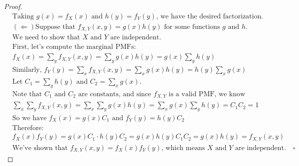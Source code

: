 \documentclass[letterpaper, 11pt]{article}
\newcommand{\1}{\mathds{1}}	%
\theoremstyle{definition}
\begin{document}
\begin{proof}
\begin{align*}
&\text{Taking } g(x) = f_X(x) \text{ and } h(y) = f_Y(y) \text{, we have the desired factorization.}\\
&(\Leftarrow) \text{Suppose that } f_{X,Y}(x,y) = g(x)h(y) \text{ for some functions } g \text{ and } h.\\
&\text{We need to show that } X \text{ and } Y \text{ are independent.}\\
&\text{First, let's compute the marginal PMFs:}\\
&f_X(x) = \sum_y f_{X,Y}(x,y) = \sum_y g(x)h(y) = g(x)\sum_y h(y)\\
&\text{Similarly, } f_Y(y) = \sum_x f_{X,Y}(x,y) = \sum_x g(x)h(y) = h(y)\sum_x g(x)\\
&\text{Let } C_1 = \sum_y h(y) \text{ and } C_2 = \sum_x g(x).\\
&\text{Note that } C_1 \text{ and } C_2 \text{ are constants, and since } f_{X,Y} \text{ is a valid PMF, we know }\\
&\sum_x \sum_y f_{X,Y}(x,y) = \sum_x \sum_y g(x)h(y) = \sum_x g(x)\sum_y h(y) = C_1 C_2 = 1\\
&\text{So we have } f_X(x) = g(x)C_1 \text{ and } f_Y(y) = h(y)C_2\\
&\text{Therefore:}\\
&f_X(x)f_Y(y) = g(x)C_1 \cdot h(y)C_2 = g(x)h(y)C_1 C_2 = g(x)h(y) = f_{X,Y}(x,y)\\
&\text{We've shown that } f_{X,Y}(x,y) = f_X(x)f_Y(y) \text{, which means } X \text{ and } Y \text{ are independent.} \quad \square
\end{align*}
\end{proof}
\end{document}
